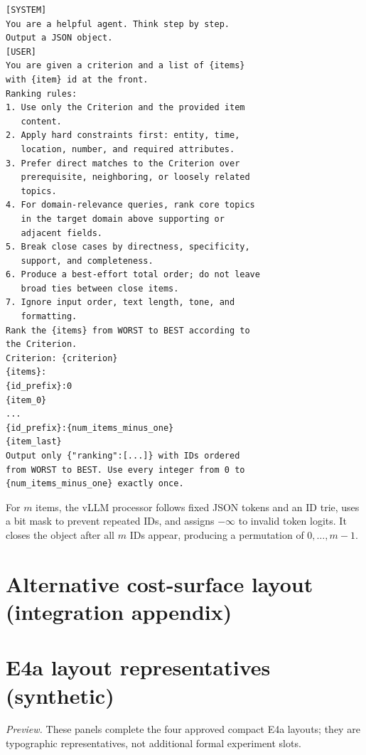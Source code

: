\begin{verbatim}
[SYSTEM]
You are a helpful agent. Think step by step.
Output a JSON object.
[USER]
You are given a criterion and a list of {items}
with {item} id at the front.
Ranking rules:
1. Use only the Criterion and the provided item
   content.
2. Apply hard constraints first: entity, time,
   location, number, and required attributes.
3. Prefer direct matches to the Criterion over
   prerequisite, neighboring, or loosely related
   topics.
4. For domain-relevance queries, rank core topics
   in the target domain above supporting or
   adjacent fields.
5. Break close cases by directness, specificity,
   support, and completeness.
6. Produce a best-effort total order; do not leave
   broad ties between close items.
7. Ignore input order, text length, tone, and
   formatting.
Rank the {items} from WORST to BEST according to
the Criterion.
Criterion: {criterion}
{items}:
{id_prefix}:0
{item_0}
...
{id_prefix}:{num_items_minus_one}
{item_last}
Output only {"ranking":[...]} with IDs ordered
from WORST to BEST. Use every integer from 0 to
{num_items_minus_one} exactly once.
\end{verbatim}

For $m$ items, the vLLM processor follows fixed JSON tokens and an ID trie, uses a bit mask to prevent repeated IDs, and assigns $-\infty$ to invalid token logits.  It closes the object after all $m$ IDs appear, producing a permutation of $0,\ldots,m-1$.

\section{Alternative cost-surface layout (integration appendix)}
\label{sec:appendix-e2-2x3}



\section{E4a layout representatives (synthetic)}
\label{sec:appendix-e4a-layout}

\noindent\textit{Preview.} These panels complete the four approved compact E4a layouts; they are typographic representatives, not additional formal experiment slots.


